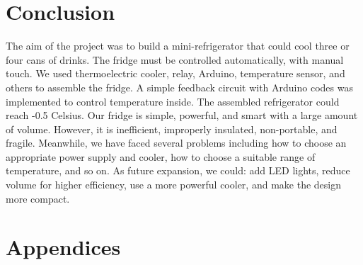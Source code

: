 \documentclass[12pt,onecolumn]{article}
\begin{document}
\section{Conclusion}
The aim of the project was to build a mini-refrigerator that could cool three or four cans of drinks. The fridge must be controlled automatically, with manual touch. We used thermoelectric cooler, relay, Arduino, temperature sensor, and others to assemble the fridge. A simple feedback circuit with Arduino codes was implemented to control temperature inside. The assembled refrigerator could reach -0.5 Celsius. Our fridge is simple, powerful, and smart with a large amount of volume. However, it is inefficient, improperly insulated, non-portable, and fragile. Meanwhile, we have faced several problems including how to choose an appropriate power supply and cooler, how to choose a suitable range of temperature, and so on. As future expansion, we could: add LED lights, reduce volume for higher efficiency, use a more powerful cooler, and make the design more compact.
\newpage

\nocite{*}

\newpage
\section{Appendices}

\end{document}
